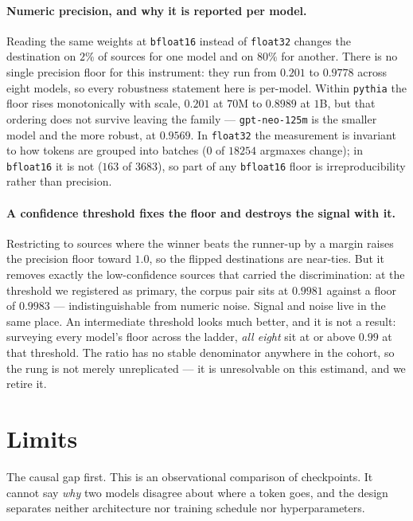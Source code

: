 \documentclass[11pt]{article}
\begin{document}
\paragraph{Numeric precision, and why it is reported per model.}%
Reading the same weights at \texttt{bfloat16} instead of \texttt{float32} changes the destination on
$2\%$ of sources for one model and on $80\%$ for another. There is no single precision floor for this
instrument: they run from $0.201$ to $0.9778$ across eight models, so every robustness statement here
is per-model. Within \texttt{pythia} the floor rises monotonically with scale, $0.201$ at $70$M to
$0.8989$ at $1$B, but that ordering does not survive leaving the family --- \texttt{gpt-neo-125m} is
the smaller model and the more robust, at $0.9569$. In \texttt{float32} the
measurement is invariant to how tokens are grouped into batches ($0$ of $18254$ argmaxes change); in
\texttt{bfloat16} it is not ($163$ of $3683$), so part of any \texttt{bfloat16} floor is
irreproducibility rather than precision.

\paragraph{A confidence threshold fixes the floor and destroys the signal with it.} Restricting to
sources where the winner beats the runner-up by a margin raises the precision floor toward $1.0$, so
the flipped destinations are near-ties. But it removes exactly the low-confidence sources that
carried the discrimination: at the threshold we registered as primary, the corpus pair sits at
$0.9981$ against a floor of $0.9983$ --- indistinguishable from numeric noise. Signal and noise live
in the same place. An intermediate threshold looks much better, and it is not a result:
surveying every model's floor across the ladder, \emph{all eight} sit at or above $0.99$ at that
threshold. The ratio has no stable denominator anywhere in the cohort, so the rung is not merely
unreplicated --- it is unresolvable on this estimand, and we retire it.

\section{Limits}\label{sec:limits}

The causal gap first. This is an observational comparison of checkpoints. It cannot say \emph{why}
two models disagree about where a token goes, and the design separates neither architecture nor
training schedule nor hyperparameters.
\end{document}
